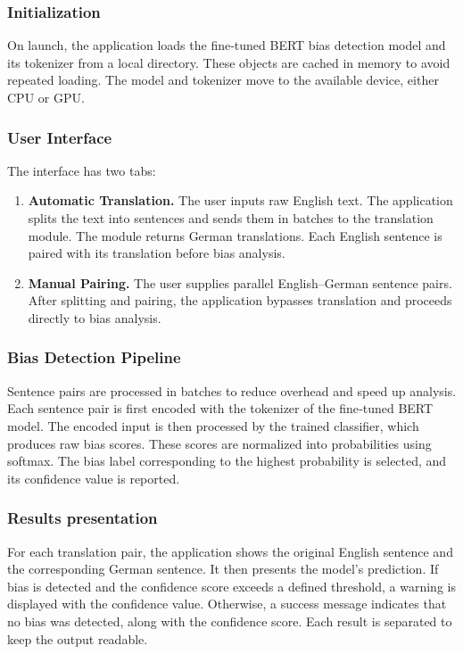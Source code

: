 \subsubsection{Initialization} 
    On launch, the application loads the fine‑tuned BERT bias detection model and its tokenizer from a local directory. These objects are cached in memory to avoid repeated loading. The model and tokenizer move to the available device, either CPU or GPU.

\subsubsection{User Interface} 
The interface has two tabs:
\begin{enumerate}
  \item \textbf{Automatic Translation.} The user inputs raw English text. The application splits the text into sentences and sends them in batches to the translation module. The module returns German translations. Each English sentence is paired with its translation before bias analysis.
  \item \textbf{Manual Pairing.} The user supplies parallel English–German sentence pairs. After splitting and pairing, the application bypasses translation and proceeds directly to bias analysis.
\end{enumerate}

\subsubsection{Bias Detection Pipeline} 
    Sentence pairs are processed in batches to reduce overhead and speed up analysis. Each sentence pair is first encoded with the tokenizer of the fine‑tuned BERT model. The encoded input is then processed by the trained classifier, which produces raw bias scores. These scores are normalized into probabilities using softmax. The bias label corresponding to the highest probability is selected, and its confidence value is reported.

\subsubsection{Results presentation}
    For each translation pair, the application shows the original English sentence and the corresponding German sentence. It then presents the model's prediction. If bias is detected and the confidence score exceeds a defined threshold, a warning is displayed with the confidence value. Otherwise, a success message indicates that no bias was detected, along with the confidence score. Each result is separated to keep the output readable.
